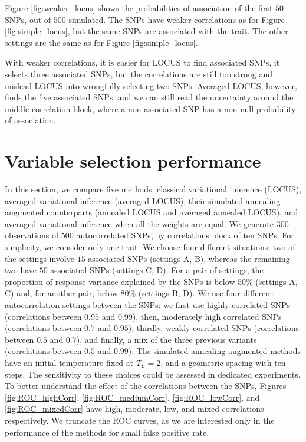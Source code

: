 \documentclass[a4paper, 11pt]{report}
\numberwithin{equation}{chapter}
\begin{document}
Figure \ref{fig:weaker_locus} shows the probabilities of association of the first $50$ SNPs, out of $500$ simulated. The SNPs have weaker correlations as for Figure \ref{fig:simple_locus}, but the same SNPs are associated with the trait. The other settings are the same as for Figure \ref{fig:simple_locus}.

With weaker correlations, it is easier for LOCUS to find associated SNPs, it selects three associated SNPs, but the correlations are still too strong and mislead LOCUS into wrongfully selecting two SNPs. Averaged LOCUS, however, finds the five associated SNPs, and we can still read the uncertainty around the middle correlation block, where a non associated SNP has a non-null probability of association.

\section{Variable selection performance} \label{sec:varSelPerf}

In this section, we compare five methods: classical variational inference (LOCUS), averaged variational inference (averaged LOCUS), their simulated annealing augmented counterparts (annealed LOCUS and averaged annealed LOCUS), and averaged variational inference when all the weights are equal. We generate $300$ observations of $500$ autocorrelated SNPs, by correlations block of ten SNPs. For simplicity, we consider only one trait. We choose four different situations: two of the settings involve $15$ associated SNPs (settings A, B), whereas the remaining two have $50$ associated SNPs (settings C, D). For a pair of settings, the proportion of response variance explained by the SNPs is below $50\%$ (settings A, C) and, for another pair, below $80\%$ (settings B, D). We use four different autocorrelation settings between the SNPs: we first use highly correlated SNPs (correlations between $0.95$ and $0.99$), then, moderately high correlated SNPs (correlations between $0.7$ and $0.95$), thirdly, weakly correlated SNPs (correlations between $0.5$ and $0.7$), and finally, a mix of the three previous variants (correlations between $0.5$ and $0.99$). The simulated annealing augmented methods have an initial temperature fixed at $T_L = 2$, and a geometric spacing with ten steps. The sensitivity to these choices could be assessed in dedicated experiments. To better understand the effect of the correlations between the SNPs, Figures \ref{fig:ROC_highCorr}, \ref{fig:ROC_mediumCorr}, \ref{fig:ROC_lowCorr},  and \ref{fig:ROC_mixedCorr} have high, moderate, low, and mixed correlations respectively.  We truncate the ROC curves, as we are interested only in the performance of the methods for small false positive rate.
\end{document}
